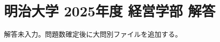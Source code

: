 \documentclass[../../uem_mei_a.tex]{subfiles}
\begin{document}
    \section{明治大学 2025年度 経営学部 解答}

    解答未入力。問題数確定後に大問別ファイルを追加する。
\end{document}

